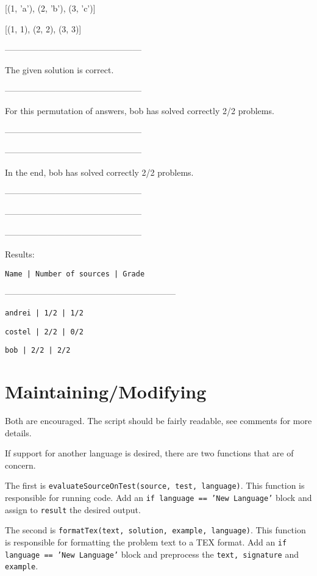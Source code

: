 \documentclass[a4paper,12pt]{article}
\begin{document}
\begin{itemize}
\begin{itemize}
[('a', 1), ('b', 2), ('c', 4)]

[(1, 'a'), (2, 'b'), (3, 'c')]

[(1, 1), (2, 2), (3, 3)]

------------------------------------------------

The given solution is correct.

------------------------------------------------

For this permutation of answers, bob has solved correctly 2/2 problems.

------------------------------------------------

------------------------------------------------

In the end, bob has solved correctly 2/2 problems.

------------------------------------------------

------------------------------------------------

------------------------------------------------

Results:

\texttt{Name                          | Number of sources   | Grade}

------------------------------------------------------------

\texttt{andrei                        | 1/2                 | 1/2}

\texttt{costel                        | 2/2                 | 0/2}

\texttt{bob                           | 2/2                 | 2/2}

   
 \end{itemize}
 
\end{itemize}


\section{Maintaining/Modifying}

Both are encouraged. The script should be fairly readable, see comments for more details. 

If support for another language is desired, there are two functions that are of concern. 

The first is \texttt{evaluateSourceOnTest(source, test, language)}. This function is responsible for running code. Add an \texttt{if language == 'New Language'} block and assign to \texttt{result} the desired output.

The second is \texttt{formatTex(text, solution, example, language)}. This function is responsible for formatting the problem text to a TEX format. Add an \texttt{if language == 'New Language'} block and preprocess the \texttt{text, signature} and \texttt{example}.
\end{document}
